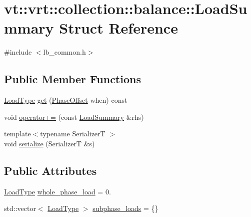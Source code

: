 \hypertarget{structvt_1_1vrt_1_1collection_1_1balance_1_1_load_summary}{}\section{vt\+:\+:vrt\+:\+:collection\+:\+:balance\+:\+:Load\+Summary Struct Reference}
\label{structvt_1_1vrt_1_1collection_1_1balance_1_1_load_summary}


{\ttfamily \#include $<$lb\+\_\+common.\+h$>$}

\subsection*{Public Member Functions}
\begin{DoxyCompactItemize}
\item 
\hyperlink{namespacevt_a8fb51741340b87d7aaee0bef60e9896b}{Load\+Type} \hyperlink{structvt_1_1vrt_1_1collection_1_1balance_1_1_load_summary_a0e25e4bb09f5d195bc74372885eb3544}{get} (\hyperlink{structvt_1_1vrt_1_1collection_1_1balance_1_1_phase_offset}{Phase\+Offset} when) const
\item 
void \hyperlink{structvt_1_1vrt_1_1collection_1_1balance_1_1_load_summary_a3909dd1fbd0725b2bbd591e7a631efe6}{operator+=} (const \hyperlink{structvt_1_1vrt_1_1collection_1_1balance_1_1_load_summary}{Load\+Summary} \&rhs)
\item 
{\footnotesize template$<$typename SerializerT $>$ }\\void \hyperlink{structvt_1_1vrt_1_1collection_1_1balance_1_1_load_summary_af7c5e250fa9359bed76206a6a355c0df}{serialize} (SerializerT \&s)
\end{DoxyCompactItemize}
\subsection*{Public Attributes}
\begin{DoxyCompactItemize}
\item 
\hyperlink{namespacevt_a8fb51741340b87d7aaee0bef60e9896b}{Load\+Type} \hyperlink{structvt_1_1vrt_1_1collection_1_1balance_1_1_load_summary_addb4c7ef838655867e6caad69668ac04}{whole\+\_\+phase\+\_\+load} = 0.
\item 
std\+::vector$<$ \hyperlink{namespacevt_a8fb51741340b87d7aaee0bef60e9896b}{Load\+Type} $>$ \hyperlink{structvt_1_1vrt_1_1collection_1_1balance_1_1_load_summary_ae56f90c96305fc515dfa126005cf1cfe}{subphase\+\_\+loads} = \{\}
\end{DoxyCompactItemize}


